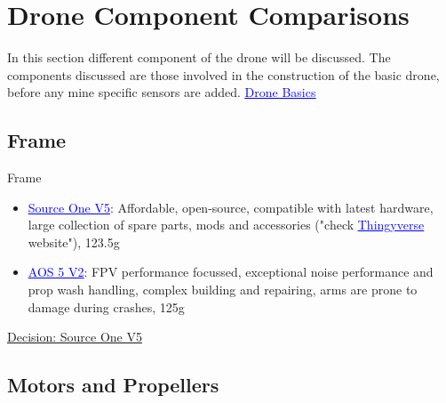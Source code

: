 \chapter{Drone Component Comparisons}

In this section different component of the drone will be discussed. The components discussed are those involved in the construction of the basic drone, before any mine specific sensors are added.
\newline
\href{https://oscarliang.com/fpv-drone-guide/#Basic-Drone-Control}{\textcolor{blue}{\underline{Drone Basics}}}
\section{Frame}
	Frame
	\begin{itemize}
		\item \href{https://www.team-blacksheep.com/products/prod:sourceone_v5}{\textcolor{blue}{\underline{Source One V5}}}: Affordable, open-source, compatible with latest hardware, large collection of spare parts, mods and accessories ("check \href{https://www.thingiverse.com/}{\textcolor{blue}{\underline{Thingyverse}}} website"), 123.5g
		\item \href{https://shop.iflight.com/AOS5-V5-Frame-Kit-Pro2127?search=aos}{\textcolor{blue}{\underline{AOS 5 V2}}}: FPV performance focussed, exceptional noise performance and prop wash handling, complex building and repairing, arms are prone to damage during crashes, 125g
	\end{itemize}
	\underline{Decision: Source One V5}
	

\section{Motors and Propellers}

